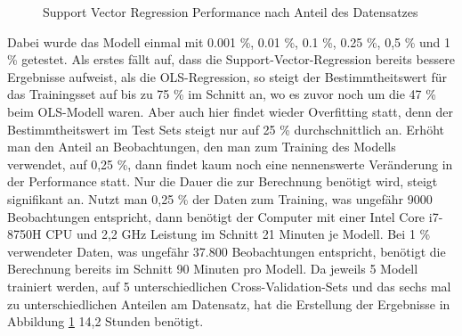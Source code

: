 \documentclass[a4paper,12pt]{thesis}
\begin{document}
\begin{figure}%
	\centering
	\qquad
	\caption{Support Vector Regression Performance nach Anteil des Datensatzes}%
	\label{fig:TrainingsShareValidation2}%
\end{figure}

Dabei wurde das Modell einmal mit 0.001 \%, 0.01 \%, 0.1 \%, 0.25 \%, 0,5 \% und 1 \% getestet. Als erstes fällt auf, dass die Support-Vector-Regression bereits bessere Ergebnisse aufweist, als die OLS-Regression, so steigt der Bestimmtheitswert für das Trainingsset auf bis zu 75 \% im Schnitt an, wo es zuvor noch um die 47 \% beim OLS-Modell waren. Aber auch hier findet wieder Overfitting statt, denn der Bestimmtheitswert im Test Sets steigt nur auf 25 \% durchschnittlich an. Erhöht man den Anteil an Beobachtungen, den man zum Training des Modells verwendet, auf 0,25 \%, dann findet kaum noch eine nennenswerte Veränderung in der Performance statt. Nur die Dauer die zur Berechnung benötigt wird, steigt signifikant an. Nutzt man 0,25 \% der Daten zum Training, was ungefähr 9000 Beobachtungen entspricht, dann benötigt der Computer mit einer Intel Core i7-8750H CPU und 2,2 GHz Leistung im Schnitt 21 Minuten je Modell. Bei 1 \% verwendeter Daten, was ungefähr 37.800 Beobachtungen entspricht, benötigt die Berechnung bereits im Schnitt 90 Minuten pro Modell. Da jeweils 5 Modell trainiert werden, auf 5 unterschiedlichen Cross-Validation-Sets und das sechs mal zu unterschiedlichen Anteilen am Datensatz, hat die Erstellung der Ergebnisse in Abbildung \ref{fig:TrainingsShareValidation2} 14,2 Stunden benötigt.
\end{document}
